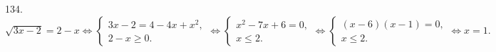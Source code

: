 134. $\sqrt{3x-2}=2-x\Leftrightarrow\begin{cases} 3x-2=4-4x+x^2,\\2-x\geqslant0.\end{cases}\Leftrightarrow
\begin{cases} x^2-7x+6=0,\\x\leqslant2.\end{cases}\Leftrightarrow\begin{cases} (x-6)(x-1)=0,\\x\leqslant2.\end{cases}
\Leftrightarrow x=1.$\\
